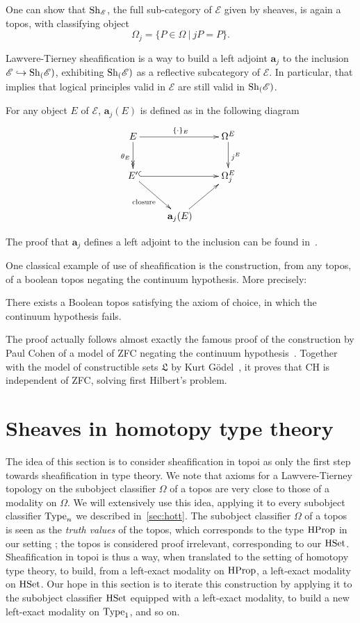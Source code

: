 One can show that $\mathrm{Sh}_{\mathcal E}$, the full sub-category of
$\mathcal E$ given by
sheaves, is again a topos, with classifying object
%
\[
\Omega_j = \{ P \in \Omega \ | \ j P  = P \}.
\]

Lawvere-Tierney sheafification is a way to build a left adjoint $\mathbf{a}_j$ to the
inclusion $\mathcal E \hookrightarrow \mathrm{Sh}_{(}\mathcal E)$, exhibiting
$\mathrm{Sh}_{(}\mathcal E)$ as a reflective subcategory of $\mathcal E$. In
particular, that implies that logical principles valid in $\mathcal E$
are still valid in $\mathrm{Sh}_{(}\mathcal E)$.

For any object $E$ of $\mathcal E$, $\mathbf{a}_j(E)$ is defined as in
the following diagram
\[
  \xymatrix{ 
    E \ar[rr]^{\{\cdot\}_E} \ar@{->>}[d]_{\theta_E} && \Omega^E \ar[d]^{j^E}\\
    E' \ar@{^{(}->}[rr] \ar[dr]_{\text{closure}} && \Omega_j^E \\
    & \mathbf{a}_j(E) \ar[ur]&
  }
\]

The proof that $\mathbf a_j$ defines a left adjoint to the inclusion
can be found in~\cite{maclanemoerdijk}.

One classical example of use of sheafification is the construction,
from any topos, of a boolean topos negating the continuum
hypothesis. More precisely:

\begin{thm}
  There exists a Boolean topos satisfying the axiom of choice, in
  which the continuum hypothesis fails.
\end{thm}

The proof actually follows almost exactly the famous proof of the
construction by Paul Cohen of a model of ZFC negating the continuum
hypothesis~\cite{cohen1966}. Together with the model of constructible
sets $\mathfrak L$ by Kurt Gödel~\cite{godel40}, it proves that CH is
independent of ZFC, solving first Hilbert's problem.


\section{Sheaves in homotopy type theory}
\label{sec:sheaf_hott}

The idea of this section is to consider sheafification in topoi as
only the first step towards sheafification in type theory. 
We note that axioms for a Lawvere-Tierney topology on the subobject
classifier $\Omega$ of a topos are very close to
those of a modality on $\Omega$. We will extensively use this idea,
applying it to every subobject classifier $\operatorname{Type}_n$ we described
in~\ref{sec:hott}. The subobject
classifier $\Omega$ of a topos is seen as the {\em truth values} of the
topos, which corresponds to the type $\operatorname{HProp}$ in our setting ; the
topos is considered proof irrelevant, corresponding to our
$\operatorname{HSet}$. Sheafification in topoi is thus a way, when translated to the
setting of homotopy type theory, to build, from a left-exact modality on
$\operatorname{HProp}$, a left-exact modality on $\operatorname{HSet}$. Our hope in this section
is to iterate this construction by applying it to the subobject
classifier $\operatorname{HSet}$ equipped with a left-exact modality, to build a new
left-exact modality on $\operatorname{Type}_1$, and so on. 

